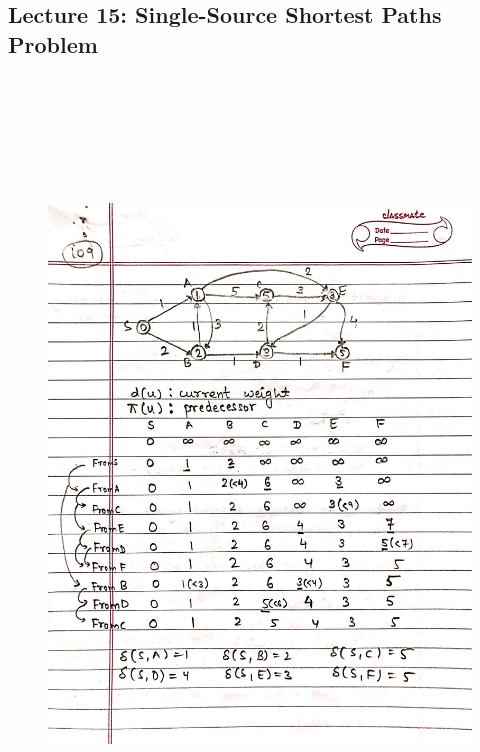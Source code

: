 \newpage
{\color{black} \subsection*{Lecture 15: Single-Source Shortest Paths Problem}}
\begin{figure}[H]
    \centering
    \includegraphics[width=16cm, height=21cm]{"./MIT-6.006/MIT-6006-109"}
\end{figure}

